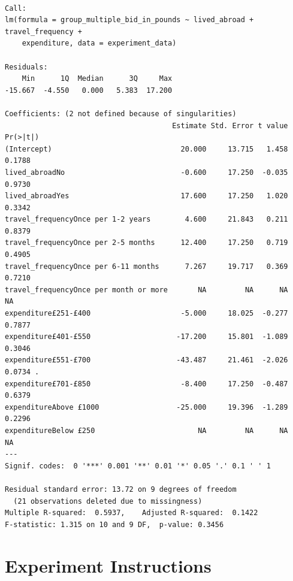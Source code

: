 \documentclass[
]{report}
\begin{document}
\begin{verbatim}

Call:
lm(formula = group_multiple_bid_in_pounds ~ lived_abroad + travel_frequency + 
    expenditure, data = experiment_data)

Residuals:
    Min      1Q  Median      3Q     Max 
-15.667  -4.550   0.000   5.383  17.200 

Coefficients: (2 not defined because of singularities)
                                       Estimate Std. Error t value Pr(>|t|)  
(Intercept)                              20.000     13.715   1.458   0.1788  
lived_abroadNo                           -0.600     17.250  -0.035   0.9730  
lived_abroadYes                          17.600     17.250   1.020   0.3342  
travel_frequencyOnce per 1-2 years        4.600     21.843   0.211   0.8379  
travel_frequencyOnce per 2-5 months      12.400     17.250   0.719   0.4905  
travel_frequencyOnce per 6-11 months      7.267     19.717   0.369   0.7210  
travel_frequencyOnce per month or more       NA         NA      NA       NA  
expenditure£251-£400                     -5.000     18.025  -0.277   0.7877  
expenditure£401-£550                    -17.200     15.801  -1.089   0.3046  
expenditure£551-£700                    -43.487     21.461  -2.026   0.0734 .
expenditure£701-£850                     -8.400     17.250  -0.487   0.6379  
expenditureAbove £1000                  -25.000     19.396  -1.289   0.2296  
expenditureBelow £250                        NA         NA      NA       NA  
---
Signif. codes:  0 '***' 0.001 '**' 0.01 '*' 0.05 '.' 0.1 ' ' 1

Residual standard error: 13.72 on 9 degrees of freedom
  (21 observations deleted due to missingness)
Multiple R-squared:  0.5937,    Adjusted R-squared:  0.1422 
F-statistic: 1.315 on 10 and 9 DF,  p-value: 0.3456
\end{verbatim}

\section{Experiment Instructions}\label{experiment-instructions}

\newpage{}
\end{document}
